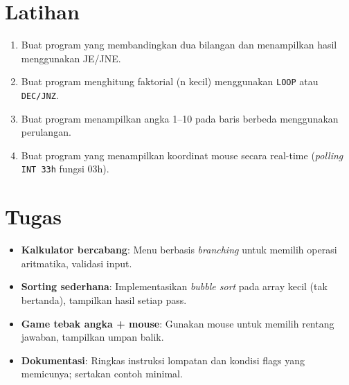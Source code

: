 \documentclass[../main.tex]{subfiles}
\begin{document}
\section{Latihan}
\begin{enumerate}
  \item Buat program yang membandingkan dua bilangan dan menampilkan hasil menggunakan JE/JNE.
  \item Buat program menghitung faktorial (n kecil) menggunakan \texttt{LOOP} atau \texttt{DEC/JNZ}.
  \item Buat program menampilkan angka 1--10 pada baris berbeda menggunakan perulangan.
  \item Buat program yang menampilkan koordinat mouse secara real-time (\textit{polling} \texttt{INT 33h} fungsi 03h).
\end{enumerate}

\section{Tugas}
\begin{itemize}
  \item \textbf{Kalkulator bercabang}: Menu berbasis \textit{branching} untuk memilih operasi aritmatika, validasi input.
  \item \textbf{Sorting sederhana}: Implementasikan \textit{bubble sort} pada array kecil (tak bertanda), tampilkan hasil setiap pass.
  \item \textbf{Game tebak angka + mouse}: Gunakan mouse untuk memilih rentang jawaban, tampilkan umpan balik.
  \item \textbf{Dokumentasi}: Ringkas instruksi lompatan dan kondisi flags yang memicunya; sertakan contoh minimal.
\end{itemize}
\end{document}
